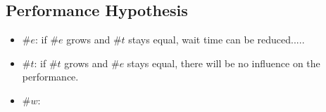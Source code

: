 \documentclass[10pt,a4paper]{article}
\begin{document}
\subsection{Performance Hypothesis}
\begin{itemize}
 \item $\#e$:  if $\#e$ grows and $\#t$ stays equal, wait time can be
 reduced..... 
 \item $\#t$:  if $\#t$ grows and $\#e$ stays equal, there will be no influence on the performance.
 \item $\#w$:  
\end{itemize}
\end{document}
